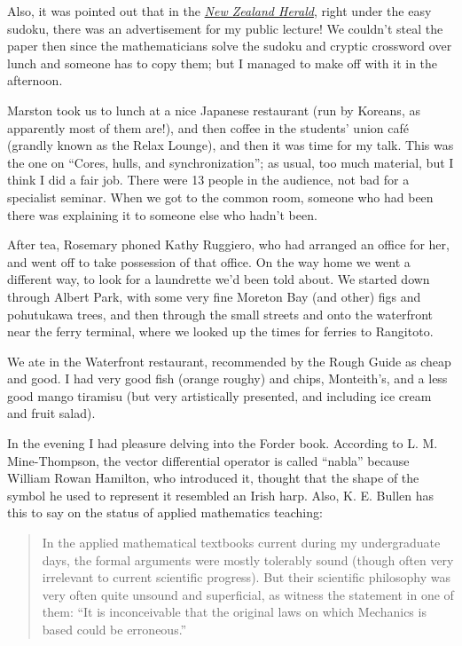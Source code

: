 \documentclass[12pt,a4paper]{article}
\begin{document}
Also, it was pointed out that in the 
\href{http://www.nzherald.co.nz}{\emph{New Zealand Herald}},
right under the easy sudoku, there was an advertisement for my public lecture! 
We couldn't steal the paper then since the mathematicians solve the sudoku 
and cryptic crossword over lunch and someone has to copy them; but I managed 
to make off with it in the afternoon.

Marston took us to lunch at a nice Japanese restaurant (run by Koreans, as
apparently most of them are!), and then coffee in the students' union 
caf\'e (grandly known as the Relax Lounge),
and then it was time for my talk. This was the one on ``Cores, hulls, and
synchronization''; as usual, too much material, but I think I did a fair job.
There were 13 people in the audience, not bad for a specialist seminar.
When we got to the common room, someone who had been there was explaining it
to someone else who hadn't been.

After tea, Rosemary phoned Kathy Ruggiero, who had arranged an office for
her, and went off to take possession of that office. On the way home we
went a different way, to look for a laundrette we'd been told about. We
started down through Albert Park, with some very fine Moreton Bay (and other)
figs and pohutukawa trees, and then through the small streets and onto the
waterfront near the ferry terminal, where we looked up the times for ferries
to Rangitoto.

We ate in the Waterfront restaurant, recommended by the Rough Guide as
cheap and good. I had very good fish (orange roughy) and chips, Monteith's,
and a less good mango tiramisu (but very artistically presented, and including 
ice cream and fruit salad).

In the evening I had pleasure delving into the Forder book. According to
L. M. Mine-Thompson, the vector differential operator is called ``nabla''
because William Rowan Hamilton, who introduced it, thought that the shape
of the symbol he used to represent it resembled an Irish harp. Also,
K. E. Bullen has this to say on the status of applied mathematics teaching:
\begin{quote}
In the applied mathematical textbooks current during my undergraduate days,
the formal arguments were mostly tolerably sound (though often very
irrelevant to current scientific progress). But their scientific philosophy
was very often quite unsound and superficial, as witness the statement in
one of them: ``It is inconceivable that the original laws on which Mechanics
is based could be erroneous.''
\end{quote}
\end{document}
